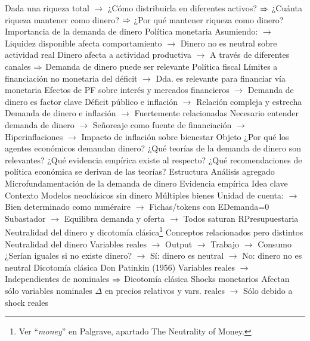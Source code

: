 \documentclass{nuevotema}
\begin{document}
\begin{esquemal}
				\4[] Dada una riqueza total
				\4[] $\to$ ¿Cómo distribuirla en diferentes activos?
				\4[] $\then$ ¿Cuánta riqueza mantener como dinero?
				\4[] $\then$ ¿Por qué mantener riqueza como dinero?
			\3 Importancia de la demanda de dinero
				\4 Política monetaria
				\4[] Asumiendo:
				\4[] $\to$ Liquidez disponible afecta comportamiento
				\4[] $\to$ Dinero no es neutral sobre actividad real
				\4[] Dinero afecta a actividad productiva
				\4[] $\to$ A través de diferentes canales
				\4[] $\then$ Demanda de dinero puede ser relevante
				\4 Política fiscal
				\4[] Límites a financiación no monetaria del déficit
				\4[] $\to$ Dda. es relevante para financiar vía monetaria
				\4[] Efectos de PF sobre interés y mercados financieros
				\4[] $\to$ Demanda de dinero es factor clave
				\4[] Déficit público e inflación
				\4[] $\to$ Relación compleja y estrecha
				\4[] Demanda de dinero e inflación
				\4[] $\to$ Fuertemente relacionadas
				\4[$\then$] Necesario entender demanda de dinero
				\4[] $\to$ Señoreaje como fuente de financiación
				\4[] $\to$ Hiperinflaciones
				\4[] $\to$ Impacto de inflación sobre bienestar
		\2 Objeto
			\3 ¿Por qué los agentes económicos demandan dinero?
			\3 ¿Qué teorías de la demanda de dinero son relevantes?
			\3 ¿Qué evidencia empírica existe al respecto?
			\3 ¿Qué recomendaciones de política económica se derivan de las teorías?
		\2 Estructura
			\3 Análisis agregado
			\3 Microfundamentación de la demanda de dinero
			\3 Evidencia empírica
	\1 
		\2 Idea clave
			\3 Contexto
				\4 Modelos neoclásicos sin dinero
				\4[] Múltiples bienes
				\4[] Unidad de cuenta:
				\4[] $\to$ Bien determinado como numéraire
				\4[] $\to$ Fichas/tokens con EDemanda=0
				\4[] Subastador
				\4[] $\to$ Equilibra demanda y oferta
				\4[] $\to$ Todos saturan RPresupuestaria
				\4 Neutralidad del dinero y dicotomía clásica\footnote{Ver ``\textit{money}'' en Palgrave, apartado The Neutrality of Money.}
				\4[] Conceptos relacionados pero distintos
				\4 Neutralidad del dinero
				\4[] Variables reales
				\4[] $\to$ Output
				\4[] $\to$ Trabajo
				\4[] $\to$ Consumo
				\4[] ¿Serían iguales si no existe dinero?
				\4[] $\to$ Sí: dinero es neutral
				\4[] $\to$ No: dinero no es neutral
				\4 Dicotomía clásica
				\4[] Don Patinkin (1956)
				\4[] Variables reales
				\4[] $\to$ Independientes de nominales
				\4[] $\then$ Dicotomía clásica
				\4[] Shocks monetarios
				\4[] Afectan sólo variables nominales
				\4[] $\Delta$ en precios relativos y vars. reales
				\4[] $\to$ Sólo debido a shock reales

\end{esquemal}
\end{document}

